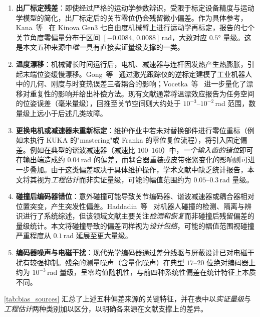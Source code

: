 \begin{enumerate}
  \item \textbf{出厂标定残差}：即使经过严格的运动学参数辨识，受限于标定设备精度与运动学模型的简化，出厂标定后的关节零位仍会残留微小偏差。作为具体参考，Kana~等~\cite{kana2022fast} 在 Kinova Gen3 七自由度机械臂上进行运动学再标定，报告的七个关节角度零偏量分布于区间 $[-0.0084,\,0.0088]$\,rad，大致对应 $0.5°$ 量级。这是本文五种来源中\emph{唯一}具有直接实证量级支撑的一类。

  \item \textbf{温度漂移}：机械臂长时间运行后，电机、减速器与连杆因发热产生热膨胀，引起末端位姿缓慢漂移。Gong~等~\cite{gong2000nongeometric} 通过激光跟踪仪的逆标定建模了工业机器人中的几何、刚度与时变热误差三者耦合的影响；Vocetka~等~\cite{vocetka2021influence} 进一步量化了漂移对重复性的影响并给出补偿方法。现有文献通常将温漂效应报告为任务空间的位姿误差（毫米量级），回推至关节空间则大约处于 $10^{-3}$--$10^{-2}$\,rad 范围，数量级上远小于后述几类故障。

  \item \textbf{更换电机或减速器未重新标定}：维护作业中若未对替换部件进行零位重标（例如未执行 KUKA 的"mastering"或 Franka 的零位复位流程），将引入固定偏差。例如在典型的谐波减速器（减速比 $100$--$160$）中，\emph{一个输入齿的错位}即可在输出端造成约 $0.04$\,rad 的偏差，而耦合器重装或皮带张紧变化的影响则可进一步叠加。由于这类偏差取决于具体维护操作，学术文献中缺乏统计报告，本文将其视为\emph{工程估计}而非实证量级，可能的幅值范围约为 $0.05$--$0.3$\,rad 量级。

  \item \textbf{碰撞后编码器错位}：意外碰撞可能导致关节编码器、谐波减速器或耦合器相对位置突变，产生突发性偏差。Haddadin~等~\cite{haddadin2017robot} 对机器人碰撞的检测、隔离与辨识进行了系统综述，但该领域文献主要关注\emph{检测和恢复}而非碰撞后残留偏差的量级统计。本文将碰撞导致的偏差同样视为\emph{设计包络}，可能的幅值范围视碰撞严重程度从 $0.1$\,rad 延展至更大量级。

  \item \textbf{编码器噪声与电磁干扰}：现代光学编码器通过差分线驱与屏蔽设计已对电磁干扰有较强抑制。残余的测量噪声（含量化噪声）在典型 $17$--$20$ 位绝对编码器上约为 $10^{-3}$\,rad 量级，呈零均值随机性，与前四种系统性偏差在统计特征上本质不同。
\end{enumerate}

\cref{tab:bias_sources} 汇总了上述五种偏差来源的关键特征，并在表中以\emph{实证量级}与\emph{工程估计}两种类别加以区分，以明确各来源在文献支撑上的差异。

